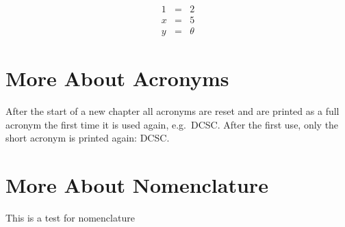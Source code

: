 \begin{eqnarray}
  1 &=& 2\\
  x &=& 5 \\
  y &=& \theta
\end{eqnarray}


\section{More About Acronyms}

After the start of a new chapter all acronyms are reset and are printed as a full acronym the first time it is used again, e.g.\ \ac{DCSC}. After the first use, only the short acronym is printed again: \ac{DCSC}.


\section{More About Nomenclature}

This is a test for nomenclature  
